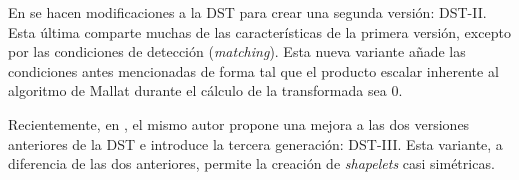 En \cite{Guido2018} se hacen modificaciones a la DST para crear una segunda versión: DST-II. Esta última
comparte muchas de las características de la primera versión, excepto por las condiciones 
de detección (\textit{matching}).
Esta nueva variante añade las condiciones antes mencionadas de forma tal que el producto escalar inherente al algoritmo
de Mallat durante el cálculo de la transformada sea $0$.

Recientemente, en \cite{Guido2021}, el mismo autor propone una mejora a las dos versiones anteriores de la 
DST e introduce la tercera generación: DST-III. Esta variante, a diferencia de las dos anteriores, permite 
la creación de \textit{shapelets} casi simétricas. 


